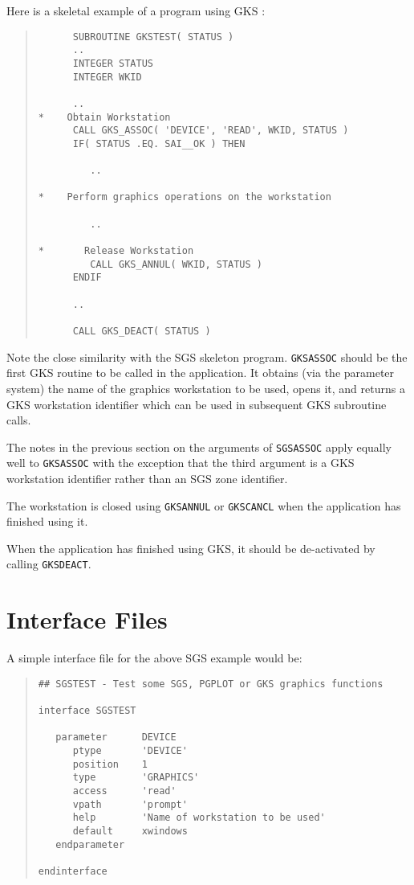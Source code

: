 \documentclass[twoside,11pt]{article}
\newcommand{\htmlref}[2]{#1}
\renewcommand{\_}{\texttt{\symbol{95}}}
\begin{document}
Here is a skeletal example of a program using GKS :
\begin{quote}
\begin{verbatim}
      SUBROUTINE GKSTEST( STATUS )
      ..
      INTEGER STATUS
      INTEGER WKID

      ..
*    Obtain Workstation
      CALL GKS_ASSOC( 'DEVICE', 'READ', WKID, STATUS )
      IF( STATUS .EQ. SAI__OK ) THEN

         ..

*    Perform graphics operations on the workstation

         ..

*       Release Workstation
         CALL GKS_ANNUL( WKID, STATUS )
      ENDIF

      ..

      CALL GKS_DEACT( STATUS )
\end{verbatim}
\end{quote}

Note the close similarity with the SGS skeleton program. 
\htmlref{{\tt GKS\_ASSOC}}{GKS_ASSOC} should be
the first GKS routine to be called in the application. It obtains (via the
parameter system) the name of the graphics workstation to be used, opens it,
and returns a GKS workstation identifier which can be used in subsequent GKS
subroutine calls.

The notes in the previous section on the arguments of {\tt SGS\_ASSOC}
 apply equally
well to {\tt GKS\_ASSOC} with the exception that the third argument is a GKS
workstation identifier rather than an SGS zone identifier.

The workstation is closed using 
\htmlref{{\tt GKS\_ANNUL}}{GKS_ANNUL} or 
\htmlref{{\tt GKS\_CANCL}}{GKS_CANCL}
when the application has finished using it.

When the application has finished using GKS, it should be de-activated by
calling \htmlref{{\tt GKS\_DEACT}}{GKS_DEACT}.

\section{Interface Files}
\label{ifl}
A simple interface file for the above SGS example would be:
\begin{quote}
\begin{verbatim}
## SGSTEST - Test some SGS, PGPLOT or GKS graphics functions

interface SGSTEST

   parameter      DEVICE
      ptype       'DEVICE'
      position    1
      type        'GRAPHICS'
      access      'read'
      vpath       'prompt'
      help        'Name of workstation to be used'
      default     xwindows
   endparameter

endinterface
\end{verbatim}
\end{quote}
\end{document}
